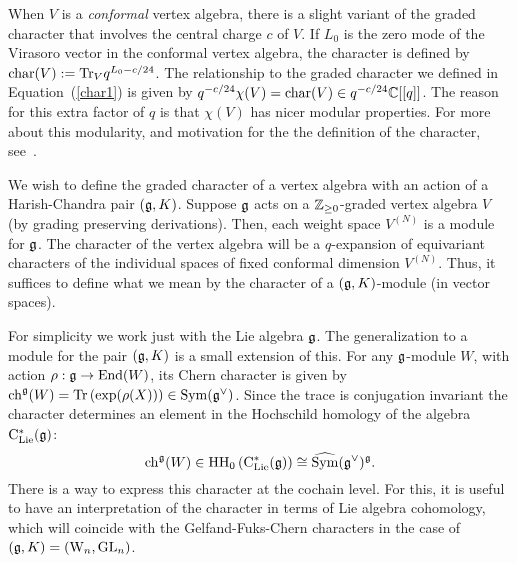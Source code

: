 \begin{rmk} 
When $V$ is a {\em conformal} vertex algebra, there is a slight variant of the graded character that involves the central charge $c$ of $V$. 
If $L_0$ is the zero mode of the Virasoro vector in the conformal vertex algebra, 
the character is defined by ${\rm char}(V) := {\rm Tr}_{V} q^{L_0 - c/24}$. 
The relationship to the graded character we defined in Equation~(\ref{char1}) is given by $q^{-c/24} \chi(V) =  {\rm char}(V) \in q^{-c/24} \mathbb C[[q]]$. 
The reason for this extra factor of $q$ is that $\chi(V)$ has nicer modular properties. 
For more about this modularity, and motivation for the the definition of the character, see~\cite{Zhu}. 
\end{rmk}

We wish to define the graded character of a vertex algebra with an action of a Harish-Chandra pair $(\mathfrak g, K)$. Suppose $\mathfrak g$ acts on a  $\mathbb Z_{\geq 0}$-graded vertex algebra $V$ (by grading preserving derivations). Then, each weight space $V^{(N)}$ is a module for $\mathfrak g$. The character of the vertex algebra will be a $q$-expansion of equivariant characters of the individual spaces of fixed conformal dimension $V^{(N)}$. Thus, it suffices to define what we mean by the character of a $(\mathfrak g,K)$-module (in vector spaces). 

For simplicity we work just with the Lie algebra $\mathfrak g$. The generalization to a module for the pair $(\mathfrak g, K)$ is a small extension of this. For any $\mathfrak g$-module $W$, with action $\rho : \mathfrak g \to {\rm End}(W)$, its Chern character is given by ${\rm ch}^\mathfrak g(W) = {\rm Tr}\left(\exp(\rho(X)) \right) \in {\rm Sym}(\mathfrak g^\vee)$. 
Since the trace is conjugation invariant the character determines an element in the Hochschild homology of the algebra ${\rm C}_{{\rm Lie}}^*(\mathfrak g)$:
\[
{\rm ch}^\mathfrak g(W) \in {\rm HH}_0\left( {\rm C}_{{\rm Lie}}^*(\mathfrak g) \right) \cong
\widehat{{\rm Sym}} (\mathfrak g^\vee)^\mathfrak g .
\]
There is a way to express this character at the cochain level. For this, it is useful to have an interpretation of the character in terms of Lie algebra cohomology, which will coincide with the Gelfand-Fuks-Chern characters in the case of $(\mathfrak g, K) = ({{\rm W}_n}, {\rm GL}_n)$. 

